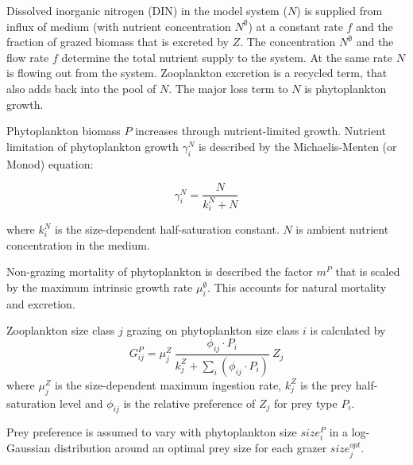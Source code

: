 \documentclass[journal abbreviation, manuscript]{copernicus}
\begin{document}
Dissolved inorganic nitrogen (DIN) in the model system ($N$) is supplied from influx of medium (with nutrient concentration $N^\emptyset$) at a constant rate $f$ and the fraction of grazed biomass that is excreted by $Z$. The concentration $N^\emptyset$ and the flow rate $f$ determine the total nutrient supply to the system. At the same rate $N$ is flowing out from the system. Zooplankton excretion is a recycled term, that also adds back into the pool of $N$. The major loss term to $N$ is phytoplankton growth.

Phytoplankton biomass $P$ increases through  nutrient-limited growth. Nutrient limitation of phytoplankton growth $\gamma_i^N$ is described by the Michaelis-Menten (or Monod) equation:

\begin{equation}
    \gamma_i^N =  \frac{N}{k_i^N + N} 
\end{equation}

where $k_i^N$ is the size-dependent half-saturation constant. $N$ is ambient nutrient concentration in the medium.

Non-grazing mortality of phytoplankton is described the factor $m^P$ that is scaled by the maximum intrinsic growth rate $\mu_i^{\emptyset}$. This accounts for natural mortality and excretion.

Zooplankton size class $j$ grazing on phytoplankton size class $i$ is calculated by
\begin{equation}
    G_{ij}^P = \mu_j^Z \ \frac{ \phi_{ij} \cdot P_i }{ k_j^Z + \sum_{i}(\phi_{ij} \cdot P_i) } \ Z_j
\end{equation}
where $\mu_j^Z$ is the size-dependent maximum ingestion rate, $k_j^Z$ is the prey half-saturation level and $\phi_{ij}$ is the relative preference of $Z_j$ for prey type $P_i$.

Prey preference is assumed to vary with phytoplankton size $size_i^{P}$ in a log-Gaussian distribution around an optimal prey size for each grazer $size_j^{opt}$.
\end{document}
